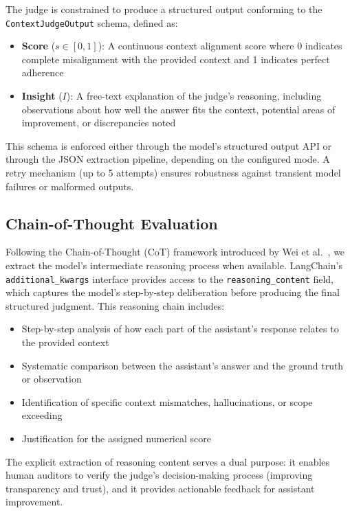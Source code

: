 \documentclass[11pt,a4paper]{article}
\begin{document}
The judge is constrained to produce a structured output conforming to the \texttt{ContextJudgeOutput} schema, defined as:

\begin{itemize}
    \item \textbf{Score} ($s \in [0, 1]$): A continuous context alignment score where 0 indicates complete misalignment with the provided context and 1 indicates perfect adherence
    \item \textbf{Insight} ($I$): A free-text explanation of the judge's reasoning, including observations about how well the answer fits the context, potential areas of improvement, or discrepancies noted
\end{itemize}

This schema is enforced either through the model's structured output API or through the JSON extraction pipeline, depending on the configured mode. A retry mechanism (up to 5 attempts) ensures robustness against transient model failures or malformed outputs.

\subsection{Chain-of-Thought Evaluation}

Following the Chain-of-Thought (CoT) framework introduced by Wei et al.~\cite{wei2022chain}, we extract the model's intermediate reasoning process when available. LangChain's \texttt{additional\_kwargs} interface provides access to the \texttt{reasoning\_content} field, which captures the model's step-by-step deliberation before producing the final structured judgment. This reasoning chain includes:

\begin{itemize}
    \item Step-by-step analysis of how each part of the assistant's response relates to the provided context
    \item Systematic comparison between the assistant's answer and the ground truth or observation
    \item Identification of specific context mismatches, hallucinations, or scope exceeding
    \item Justification for the assigned numerical score
\end{itemize}

The explicit extraction of reasoning content serves a dual purpose: it enables human auditors to verify the judge's decision-making process (improving transparency and trust), and it provides actionable feedback for assistant improvement.
\end{document}
